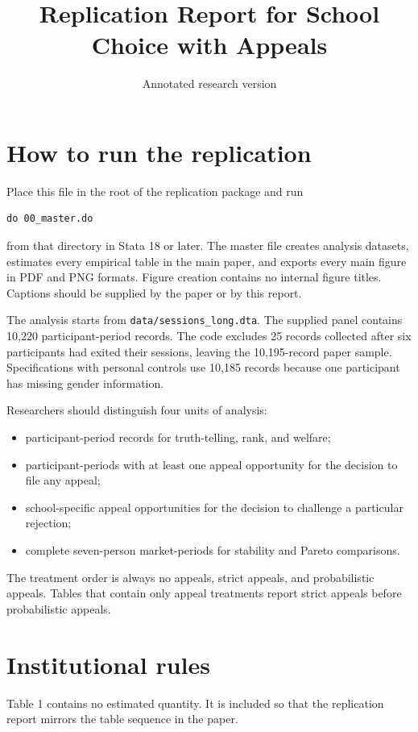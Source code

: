 \documentclass[11pt]{article}
\title{Replication Report for School Choice with Appeals}
\author{Annotated research version}
\date{}
\begin{document}
\maketitle

\section{How to run the replication}

Place this file in the root of the replication package and run
\begin{verbatim}
do 00_master.do
\end{verbatim}
from that directory in Stata 18 or later. The master file creates analysis datasets, estimates every empirical table in the main paper, and exports every main figure in PDF and PNG formats. Figure creation contains no internal figure titles. Captions should be supplied by the paper or by this report.

The analysis starts from \texttt{data/sessions\_long.dta}. The supplied panel contains 10,220 participant-period records. The code excludes 25 records collected after six participants had exited their sessions, leaving the 10,195-record paper sample. Specifications with personal controls use 10,185 records because one participant has missing gender information.

Researchers should distinguish four units of analysis:
\begin{itemize}
  \item participant-period records for truth-telling, rank, and welfare;
  \item participant-periods with at least one appeal opportunity for the decision to file any appeal;
  \item school-specific appeal opportunities for the decision to challenge a particular rejection;
  \item complete seven-person market-periods for stability and Pareto comparisons.
\end{itemize}

The treatment order is always no appeals, strict appeals, and probabilistic appeals. Tables that contain only appeal treatments report strict appeals before probabilistic appeals.

\section{Institutional rules}

Table 1 contains no estimated quantity. It is included so that the replication report mirrors the table sequence in the paper.
\end{document}
